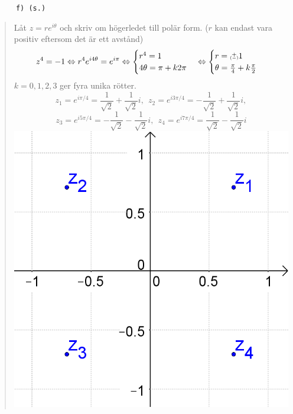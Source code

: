 \documentclass[a4paper]{article}
\newcommand{\tskcol}[1]{\textcolor{tskcol}{#1}}
\newcommand\varpm{\mathbin{\vcenter{\hbox{%
				\oalign{\hfil$\scriptstyle+$\hfil\cr
					\noalign{\kern-.5ex}					
					$\scriptscriptstyle({-})$\cr}%
			}}}}
\begin{document}
	\texttt{\tskcol{~~~~~~f) (s.)}}
	\begin{quotation}
		\noindent
		Låt $z=re^{i\theta}$ och skriv om högerledet till polär form. ($r$ kan endast vara positiv eftersom det är ett avstånd)
		\[z^4=-1 \Leftrightarrow
		r^4e^{i4\theta}=e^{i\pi} \Leftrightarrow
		\begin{cases}
		r^4 = 1 \\
		4\theta=\pi+k2\pi
		\end{cases} \Leftrightarrow
		\begin{cases}
		r=\varpm 1 \\
		\theta=\frac{\pi}{4}+k\frac{\pi}{2}
		\end{cases}\] 
		$k=0,1,2,3$ ger fyra unika rötter.
		\[z_1=e^{i\pi/4}=\frac{1}{\sqrt{2}}+\frac{1}{\sqrt{2}}i,~~
		z_2=e^{i3\pi/4}=-\frac{1}{\sqrt{2}}+\frac{1}{\sqrt{2}}i,\]
		\[z_3=e^{i5\pi/4}=-\frac{1}{\sqrt{2}}-\frac{1}{\sqrt{2}}i,~~
		z_4=e^{i7\pi/4}=\frac{1}{\sqrt{2}}-\frac{1}{\sqrt{2}}i\]
		\includegraphics[scale=0.2]{images/641f.PNG}
	\end{quotation}
	
\end{document}

